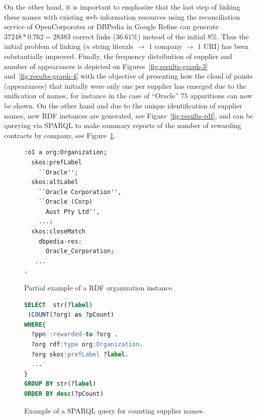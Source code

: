 \documentclass{llncs}
\begin{document}
On the other hand, it is important to emphasize that the last step of linking these names 
with existing web information resources using the reconciliation service of OpenCorporates or DBPedia in Google Refine can generate 
$37248*0.762=28383$ correct links ($36.61$\%) instead of the initial $8$\%. Thus the initial problem of linking ($n$ string literals $\to$ 
$1$ company $\to$ $1$ URI) has been substantially improved. Finally, the frequency distribution of supplier and number of appearances is depicted on Figures~\ref{fig:results-graph-3}
and~\ref{fig:results-graph-4} with the objective of presenting how the cloud of points (appearances) that initially were only one per supplier has 
emerged due to the unification of names, for instance in the case of ``Oracle'' $75$ apparitions can now be shown. On the other hand and due 
to the unique identification of supplier names, new RDF instances are generated, see Figure~\ref{fig:results-rdf}, and can be querying via SPARQL to make 
summary reports of the number of rewarding contracts by company, see Figure~\ref{fig:results-sparql}.


\begin{figure}[ht]
\begin{minipage}[b]{0.45\linewidth}
\begin{lstlisting}[language=XML]  
:o1 a org:Organization;
  skos:prefLabel 
    ``Oracle'';
  skos:altLabel 
    ``Oracle Corporation'', 
    ``Oracle (Corp) 
      Aust Pty Ltd'', 
    ...;
  skos:closeMatch 
    dbpedia-res:
      Oracle_Corporation;
   ...
.
\end{lstlisting}
\caption{Partial example of a RDF organization instance. }
 \label{fig:results-rdf}
\end{minipage}
\hspace{0.5cm}
\begin{minipage}[b]{0.45\linewidth}
\begin{lstlisting}[language=SQL]  
SELECT  str(?label) 
 (COUNT(?org) as ?pCount)
WHERE{
  ?ppn :rewarded-to ?org .
  ?org rdf:type org:Organization.
  ?org skos:prefLabel ?label.
  ...
}
GROUP BY str(?label) 
ORDER BY desc(?pCount)
\end{lstlisting}
\caption{Example of a SPARQL query for counting supplier names. }
 \label{fig:results-sparql}
\end{minipage}
\end{figure}
\end{document}
